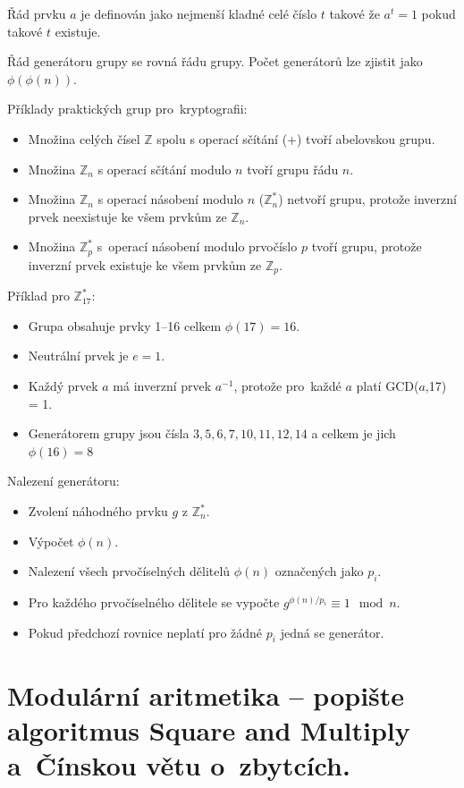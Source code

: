 Řád prvku $a$ je definován jako nejmenší kladné celé číslo $t$ takové že $a^t = 1$ pokud takové $t$ existuje. 

Řád generátoru grupy se rovná řádu grupy. Počet generátorů lze zjistit jako $\phi(\phi(n))$.

Příklady praktických grup pro~kryptografii:
\begin{itemize}[noitemsep]
    \item Množina celých čísel $\mathbb{Z}$ spolu s operací sčítání (+) tvoří abelovskou grupu.
    \item Množina $\mathbb{Z}_n$ s operací sčítání modulo $n$ tvoří grupu řádu $n$.
    \item Množina $\mathbb{Z}_n$ s operací násobení modulo $n$ ($\mathbb{Z}_n^*$) netvoří grupu, protože inverzní prvek neexistuje ke všem prvkům ze $\mathbb{Z}_n$.
    \item Množina $\mathbb{Z}_p^*$ s~operací násobení modulo prvočíslo $p$ tvoří grupu, protože inverzní prvek existuje ke všem prvkům ze $\mathbb{Z}_p$.
\end{itemize}

Příklad pro $\mathbb{Z}^*_{17}$:
\begin{itemize}[noitemsep]
    \item Grupa obsahuje prvky 1--16 celkem $\phi(17) = 16$.
    \item Neutrální prvek je $e = 1$.
    \item Každý prvek $a$ má inverzní prvek $a^{-1}$, protože pro~každé $a$ platí GCD($a$,17) = 1.
    \item Generátorem grupy jsou čísla $3,5,6,7,10,11,12,14$ a celkem je jich $\phi(16) = 8$
\end{itemize}

Nalezení generátoru:
\begin{itemize}[noitemsep]
    \item Zvolení náhodného prvku $g$ z $\mathbb{Z}_n^*$.
    \item Výpočet $\phi(n)$.
    \item Nalezení všech prvočíselných dělitelů $\phi(n)$ označených jako $p_i$.
    \item Pro každého prvočíselného dělitele se vypočte $g^{\phi(n)/p_i} \equiv 1 \mod n$.
    \item Pokud předchozí rovnice neplatí pro žádné $p_i$ jedná se generátor.
\end{itemize}

\clearpage
\section{Modulární aritmetika -- popište algoritmus Square and Multiply a~Čínskou větu o~zbytcích.}

